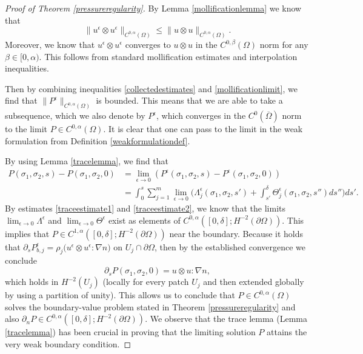 \documentclass[12pt,a4paper]{article}
\theoremstyle{definition}
\theoremstyle{remark}
\numberwithin{equation}{section}
\begin{document}
\begin{proof}[Proof of Theorem \ref{pressureregularity}] 
By Lemma \ref{mollificationlemma} we know that
\begin{equation*}
\lVert u^\epsilon \otimes u^\epsilon \rVert_{C^{0, \alpha} (\Omega)} \leq \lVert u \otimes u \rVert_{C^{0, \alpha} (\Omega)}.
\end{equation*}
Moreover, we know that $u^\epsilon \otimes u^\epsilon$ converges to $u \otimes u$ in the $C^{0, \beta} (\Omega)$ norm for any $\beta \in [0, \alpha)$. This follows from standard mollification estimates and interpolation inequalities.

Then by combining inequalities \eqref{collectedestimates} and \eqref{mollificationlimit}, we find that $\lVert P^\epsilon \rVert_{C^{0, \alpha} (\Omega)}$ is bounded. This means that we are able to take a subsequence, which we also denote by $P^\epsilon$, which converges in the $C^0 (\overline{\Omega})$ norm to the limit $P \in C^{0, \alpha} (\Omega)$. It is clear that one can pass to the limit in the weak formulation from Definition \ref{weakformulationdef}.

By using Lemma \ref{tracelemma}, we find that
\begin{align}
P(\sigma_1, \sigma_2, s) - P(\sigma_1, \sigma_2, 0) &= \lim_{\epsilon \rightarrow 0} (P^{\epsilon} (\sigma_1, \sigma_2, s) - P^\epsilon(\sigma_1,\sigma_2,0) ) \nonumber \\
&= \int_0^{s} \sum_{j=1}^m \lim_{\epsilon \rightarrow 0} \bigg( \Lambda^\epsilon_j ( \sigma_1, \sigma_2, s') + \int_{s'}^\delta \Theta^\epsilon_j (\sigma_1, \sigma_2, s'') ds'' \bigg) ds'. \label{H-2regularity}
\end{align}
By estimates \eqref{traceestimate1} and \eqref{traceestimate2}, we know that the limits $\lim_{\epsilon \rightarrow 0} \Lambda^\epsilon$ and $\lim_{\epsilon \rightarrow 0} \Theta^\epsilon$ exist as elements of $C^{0,\alpha} ([0,\delta] ; H^{-2} (\partial \Omega))$. This implies that $P \in C^{1,\alpha} ([0, \delta]; H^{-2} ( \partial \Omega) ) $ near the boundary. 
Because it holds that $\partial_{s} P^{\epsilon}_{b,j} = \rho_j \big( u^\epsilon \otimes u^\epsilon : \nabla n \big) $ on $U_j \cap \partial \Omega$, then by the established convergence we conclude
\begin{equation*}
\partial_{s} P (\sigma_1, \sigma_2, 0) = u \otimes u : \nabla n ,
\end{equation*}
which holds in $H^{-2} (U_j)$ (locally for every patch $U_j$ and then extended globally by using a partition of unity). This allows us to conclude that $P \in C^{0, \alpha} (\Omega)$ solves the boundary-value problem stated in Theorem \ref{pressureregularity} and also $\partial_n P \in C^{0,\alpha} ([0, \delta]; H^{-2} ( \partial \Omega) )$. We observe that the trace lemma (Lemma \ref{tracelemma}) has been crucial in proving that the limiting solution $P$ attains the very weak boundary condition.


\end{proof}
\end{document}
